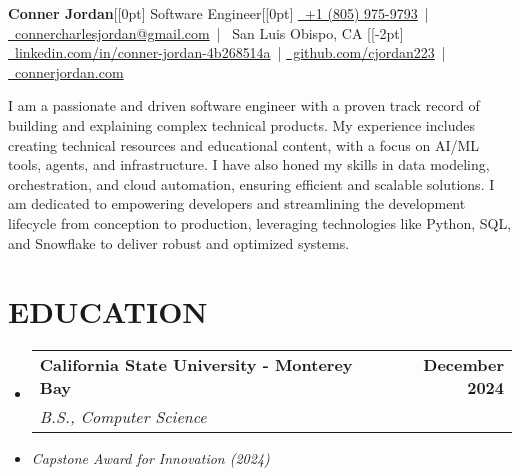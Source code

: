 \documentclass[letterpaper,10pt]{article}
\makeatletter
\newcommand{\resumeSubHeadingListStart}{\begin{itemize}[leftmargin=0in,label={}]}
\newcommand{\resumeSubHeadingListEnd}{\end{itemize}}
\newcommand{\resumeSubheading}[4]{%
  \vspace{-2pt}\item
  \begin{tabular*}{\textwidth}[t]{l@{\extracolsep{\fill}}r}
    \textbf{\large #1} & \textbf{\small #2} \\
    \textit{\large #3} & \textit{\small #4} \\
  \end{tabular*}\vspace{-2pt}
}
\makeatother
\begin{document}
\begin{center}
  {\Huge \textbf{Conner Jordan}}[[0pt]  %
  {\Large Software Engineer}[[0pt]  %
  \href{tel:+18059759793}{\faPhone\ +1 (805) 975-9793} \,|
  \href{mailto:connercharlesjordan@gmail.com}{\faEnvelope\ connercharlesjordan@gmail.com} \,|
  \faMapMarker\ San Luis Obispo, CA [[-2pt]  %
  \href{https://www.linkedin.com/in/conner-jordan-4b268514a/}{\faLinkedin\ linkedin.com/in/conner-jordan-4b268514a}
  \,|
  \href{https://github.com/cjordan223}{\faGithub\ github.com/cjordan223}
  \,|
  \href{https://connerjordan.com/}{\faGlobe\ connerjordan.com}
\end{center}

\vspace{4pt}  %

I am a passionate and driven software engineer with a proven track record of building and explaining complex technical products. My experience includes creating technical resources and educational content, with a focus on AI/ML tools, agents, and infrastructure. I have also honed my skills in data modeling, orchestration, and cloud automation, ensuring efficient and scalable solutions. I am dedicated to empowering developers and streamlining the development lifecycle from conception to production, leveraging technologies like Python, SQL, and Snowflake to deliver robust and optimized systems.
\vspace{8pt}

\section{EDUCATION}
\vspace{8pt}  %
\resumeSubHeadingListStart
  \resumeSubheading
    {California State University - Monterey Bay}{December 2024}
    {B.S., Computer Science}{}
  \item \small{\textit{Capstone Award for Innovation (2024)}}
\resumeSubHeadingListEnd
\vspace{6pt}  %

\vspace{6pt}  %
\end{document}
